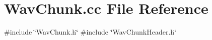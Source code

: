 \section{Wav\+Chunk.\+cc File Reference}
\label{WavChunk_8cc}
{\ttfamily \#include \char`\"{}Wav\+Chunk.\+h\char`\"{}}\newline
{\ttfamily \#include \char`\"{}Wav\+Chunk\+Header.\+h\char`\"{}}\newline

